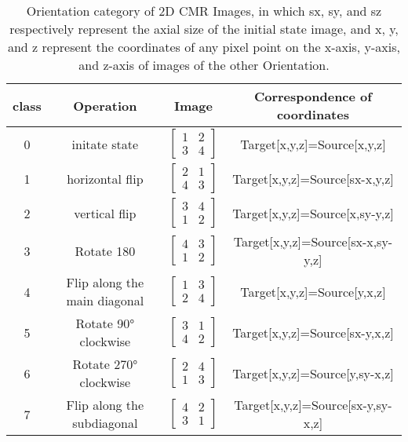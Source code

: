 \documentclass[runningheads]{llncs}
\begin{document}
\begin{table}[htbp]
  \centering
  \caption{Orientation category of 2D CMR Images, in which sx, sy, and sz respectively represent the axial size of the initial state image, and x, y, and z represent the coordinates of any pixel point on the x-axis, y-axis, and z-axis of images of the other Orientation.}
  \setlength{\tabcolsep}{2mm}%
    \begin{tabular}{cp{9.335em}cc}
    \toprule
    class & \multicolumn{1}{c}{Operation} & Image & Correspondence of coordinates \\
    \midrule
    0     & \multicolumn{1}{c}{initate state} & $\begin{bmatrix} 1 & 2 \\ 3 & 4 \end{bmatrix}$  & Target[x,y,z]=Source[x,y,z] \\
    1     & \multicolumn{1}{c}{horizontal flip} & $\begin{bmatrix} 2 & 1 \\ 4 & 3 \end{bmatrix}$  & Target[x,y,z]=Source[sx-x,y,z] \\
    2     & \multicolumn{1}{c}{vertical flip} & $\begin{bmatrix} 3 & 4 \\ 1 & 2 \end{bmatrix}$  & Target[x,y,z]=Source[x,sy-y,z] \\
    3     & \multicolumn{1}{c}{Rotate 180} & $\begin{bmatrix} 4 & 3 \\ 1 & 2 \end{bmatrix}$  & Target[x,y,z]=Source[sx-x,sy-y,z] \\
    4     & \multicolumn{1}{c}{Flip along the main diagonal}  & $\begin{bmatrix} 1 & 3 \\ 2 & 4 \end{bmatrix}$  & Target[x,y,z]=Source[y,x,z] \\
    5     & \multicolumn{1}{c}{Rotate 90° clockwise} & $\begin{bmatrix} 3 & 1 \\ 4 & 2 \end{bmatrix}$  & Target[x,y,z]=Source[sx-y,x,z] \\
    6     & \multicolumn{1}{c}{Rotate 270° clockwise} & $\begin{bmatrix} 2 & 4 \\ 1 & 3 \end{bmatrix}$  & Target[x,y,z]=Source[y,sy-x,z] \\
    7     & \multicolumn{1}{c}{Flip along the subdiagonal} & $\begin{bmatrix} 4 & 2 \\ 3 & 1 \end{bmatrix}$  & Target[x,y,z]=Source[sx-y,sy-x,z] \\
    \bottomrule
    \end{tabular}%
  \label{tab:addlabel}%
\end{table}%
\end{document}
